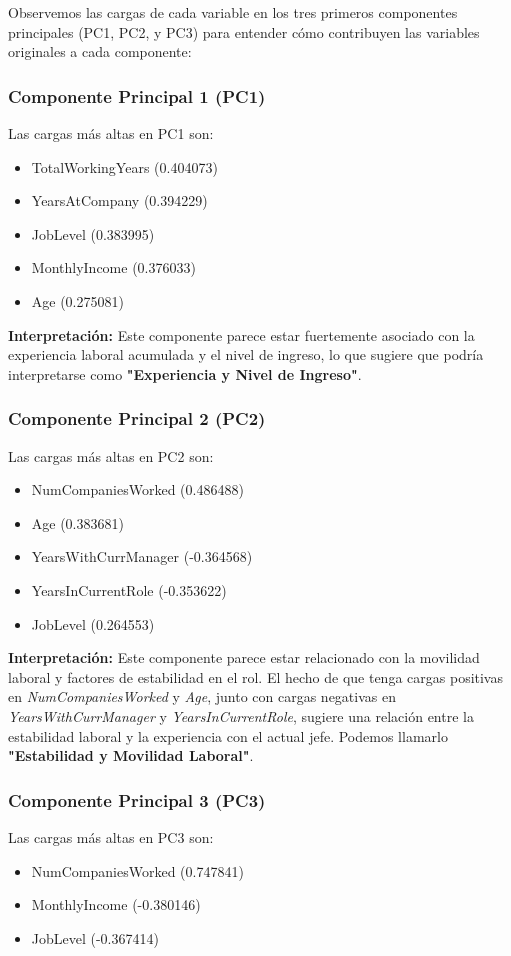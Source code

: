 Observemos las cargas de cada variable en los tres primeros componentes principales (PC1, PC2, y PC3) para entender cómo contribuyen las variables originales a cada componente:

\subsubsection*{Componente Principal 1 (PC1)}
Las cargas más altas en PC1 son:
\begin{itemize}
    \item TotalWorkingYears (0.404073)
    \item YearsAtCompany (0.394229)
    \item JobLevel (0.383995)
    \item MonthlyIncome (0.376033)
    \item Age (0.275081)
\end{itemize}

\textbf{Interpretación:} Este componente parece estar fuertemente asociado con la experiencia laboral acumulada y el nivel de ingreso, lo que sugiere que podría interpretarse como \textbf{"Experiencia y Nivel de Ingreso"}.

\subsubsection*{Componente Principal 2 (PC2)}
Las cargas más altas en PC2 son:
\begin{itemize}
    \item NumCompaniesWorked (0.486488)
    \item Age (0.383681)
    \item YearsWithCurrManager (-0.364568)
    \item YearsInCurrentRole (-0.353622)
    \item JobLevel (0.264553)
\end{itemize}

\textbf{Interpretación:} Este componente parece estar relacionado con la movilidad laboral y factores de estabilidad en el rol. El hecho de que tenga cargas positivas en \textit{NumCompaniesWorked} y \textit{Age}, junto con cargas negativas en \textit{YearsWithCurrManager} y \textit{YearsInCurrentRole}, sugiere una relación entre la estabilidad laboral y la experiencia con el actual jefe. Podemos llamarlo \textbf{"Estabilidad y Movilidad Laboral"}.

\subsubsection*{Componente Principal 3 (PC3)}
Las cargas más altas en PC3 son:
\begin{itemize}
    \item NumCompaniesWorked (0.747841)
    \item MonthlyIncome (-0.380146)
    \item JobLevel (-0.367414)
\end{itemize}

